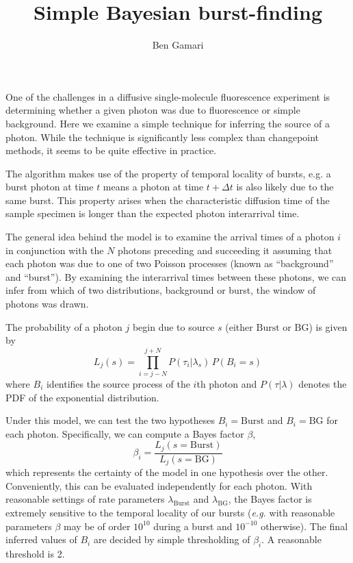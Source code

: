 \documentclass{article}
\title{Simple Bayesian burst-finding}
\author{Ben Gamari}
\newcommand{\lburst}{\ensuremath{\lambda_\mathrm{Burst}}}
\newcommand{\lbg}{\ensuremath{\lambda_\mathrm{BG}}}
\begin{document}
\maketitle

One of the challenges in a diffusive single-molecule fluorescence
experiment is determining whether a given photon was due to
fluorescence or simple background. Here we examine a simple technique
for inferring the source of a photon. While the technique is
significantly less complex than changepoint
methods\cite{watkins2005,ensign2010}, it seems to be quite effective
in practice.

The algorithm makes use of the property of temporal locality of
bursts, e.g. a burst photon at time $t$ means a photon at time $t +
\Delta t$ is also likely due to the same burst. This property arises
when the characteristic diffusion time of the sample specimen is 
longer than the expected photon interarrival time.

The general idea behind the model is to examine the arrival times of a
photon $i$ in conjunction with the $N$ photons preceding and
succeeding it assuming that each photon was due to one of two Poisson
processes (known as ``background'' and ``burst''). By examining the
interarrival times between these photons, we can infer from which of
two distributions, background or burst, the window of photons was
drawn.

The probability of a photon $j$ begin due to source $s$ (either
$\mathrm{Burst}$ or $\mathrm{BG}$) is given by
\begin{equation}
  L_j(s) = \prod_{i=j-N}^{j+N} P(\tau_i \vert \lambda_s)\, P(B_i = s)
\end{equation}
where $B_i$ identifies the source process of the $i$th photon and
$P(\tau \vert \lambda)$ denotes the PDF of the exponential
distribution.

Under this model, we can test the two hypotheses $B_i =
\mathrm{Burst}$ and $B_i = \mathrm{BG}$ for each photon. Specifically,
we can compute a Bayes factor $\beta$,
\begin{equation}
  \beta_i = \frac{L_j(s=\mathrm{Burst})}{L_j(s=\mathrm{BG})}
\end{equation}
which represents the certainty of the model in one hypothesis over the
other. Conveniently, this can be evaluated independently for each
photon.  With reasonable settings of rate parameters $\lburst$ and
$\lbg$, the Bayes factor is extremely sensitive to the temporal
locality of our bursts ({\it e.g.} with reasonable parameters $\beta$
may be of order $10^{10}$ during a burst and $10^{-10}$
otherwise). The final inferred values of $B_i$ are decided by simple
thresholding of $\beta_i$. A reasonable threshold is 2.
\end{document}
